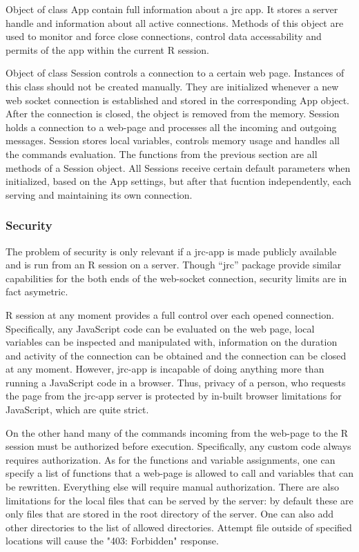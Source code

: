 \documentclass[twocolumn,10pt]{article}
\begin{document}
Object of class App contain full information about a jrc app. It stores a server handle and information about all active connections. Methods of this object are used to monitor and force close connections, control data accessability and permits of the app within the current R session.

Object of class Session controls a connection to a certain web page. Instances of this class should not be created manually. They are initialized whenever a new web socket connection is established and stored in the corresponding App object. After the connection is closed, the object is removed from the memory. Session holds a connection to a web-page and processes all the incoming and outgoing messages. Session stores local variables, controls memory usage and handles all the commands evaluation. The functions from the previous section are all methods of a Session object. All Sessions receive certain default parameters when initialized, based on the App settings, but after that fucntion independently, each serving and maintaining its own connection. 

\subsubsection{Security}

The problem of security is only relevant if a jrc-app is made publicly available and is run from an R session on a server. Though ``jrc'' package provide similar capabilities for the both ends of the web-socket connection, security limits are in fact asymetric. 

R session at any moment provides a full control over each opened connection. Specifically, any JavaScript code can be evaluated on the web page, local variables can be inspected and manipulated with, information on the duration and activity of the connection can be obtained and the connection can be closed at any moment. However, jrc-app is incapable of doing anything more than running a JavaScript code in a browser. Thus, privacy of a person, who requests the page from the jrc-app server is protected by in-built browser limitations for JavaScript, which are quite strict. 

On the other hand many of the commands incoming from the web-page to the R session must be authorized before execution. Specifically, any custom code always requires authorization. As for the functions and variable assignments, one can specify a list of functions that a web-page is allowed to call and variables that can be rewritten. Everything else will require manual authorization. There are also limitations for the local files that can be served by the server: by default these are only files that are stored in the root directory of the server. One can also add other directories to the list of allowed directories. Attempt file outside of specified locations will cause the "403: Forbidden" response.
\end{document}
